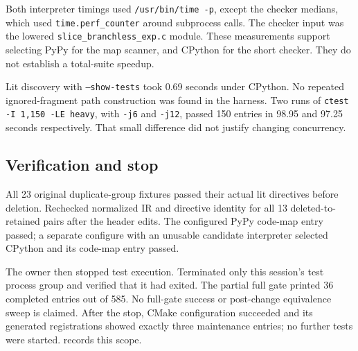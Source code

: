 Both interpreter timings used \texttt{/usr/bin/time -p}, except the checker
medians, which used \texttt{time.perf\_counter} around subprocess calls.
The checker input was the lowered \texttt{slice\_branchless\_exp.c} module.
These measurements support selecting PyPy for the map scanner, and CPython
for the short checker. They do not establish a total-suite speedup.

Lit discovery with \texttt{--show-tests} took 0.69 seconds under CPython.
No repeated ignored-fragment path construction was found in the harness.
Two runs of \texttt{ctest -I 1,150 -LE heavy}, with \texttt{-j6} and
\texttt{-j12}, passed 150 entries in 98.95 and 97.25 seconds respectively.
That small difference did not justify changing concurrency.

\subsection*{Verification and stop}
All 23 original duplicate-group fixtures passed their actual lit directives
before deletion. Rechecked normalized IR and directive identity for all 13
deleted-to-retained pairs after the header edits. The configured PyPy
code-map entry passed; a separate configure with an unusable candidate
interpreter selected CPython and its code-map entry passed.

The owner then stopped test execution. Terminated only this session's test
process group and verified that it had exited. The partial full gate printed
36 completed entries out of 585. No full-gate success or post-change
equivalence sweep is claimed. After the stop, CMake configuration succeeded
and its generated registrations showed exactly three maintenance entries;
no further tests were started.  records this scope.
